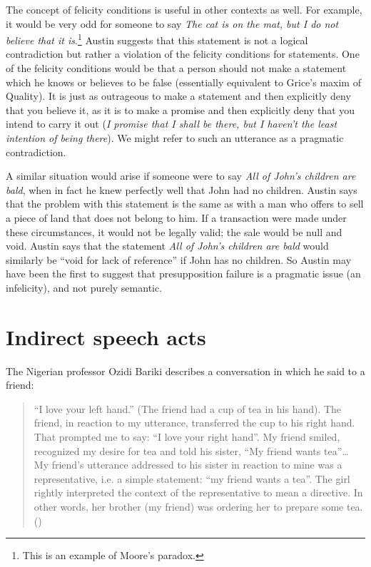 The concept of felicity conditions is useful in other contexts as well. For example, it would be very odd for someone to say \textit{The cat is on the mat, but I do not believe that it is}.\footnote{This is an example of Moore’s paradox.} Austin suggests that this statement is not a logical contradiction but rather a violation of the felicity conditions for statements. One of the felicity conditions would be that a person should not make a statement which he knows or believes to be false (essentially equivalent to Grice’s maxim of Quality). It is just as outrageous to make a statement and then explicitly deny that you believe it, as it is to make a promise and then explicitly deny that you intend to carry it out (\textit{I promise that I shall be there, but I haven’t the least intention of being there}). We might refer to such an utterance as a pragmatic contradiction.



A similar situation would arise if someone were to say \textit{All of John’s children are bald}, when in fact he knew perfectly well that John had no children. Austin says that the problem with this statement is the same as with a man who offers to sell a piece of land that does not belong to him. If a transaction were made under these circumstances, it would not be legally valid; the sale would be null and void. Austin says that the statement \textit{All of John’s children are bald} would similarly be “void for lack of reference” if John has no children. So Austin may have been the first to suggest that presupposition failure is a pragmatic issue (an infelicity), and not purely semantic.


\section{Indirect speech acts}\label{sec:10.3}

The  {Nigerian} professor Ozidi Bariki describes a conversation in which he said to a friend:


\begin{quote}
“I love your left hand.” (The friend had a cup of tea in his hand). The friend, in reaction to my utterance, transferred the cup to his right hand. That prompted me to say: “I love your right hand”. My friend smiled, recognized my desire for tea and told his sister, “My friend wants tea”… My friend’s utterance addressed to his sister in reaction to mine was a representative, i.e. a simple statement: “my friend wants a tea”. The girl rightly interpreted the context of the representative to mean a directive. In other words, her brother (my friend) was ordering her to prepare some tea.  (\citealt{Bariki2008})
\end{quote}


